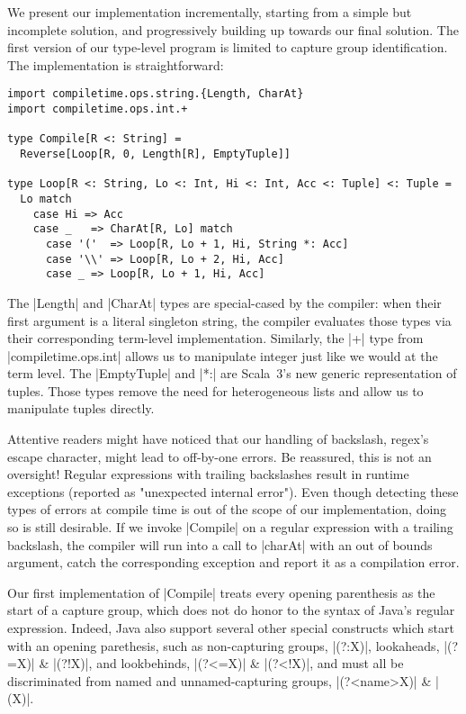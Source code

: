 We present our implementation incrementally, starting from a simple but incomplete solution, and progressively building up towards our final solution.
The first version of our type-level program is limited to capture group identification.
The implementation is straightforward:

\begin{lstlisting}
import compiletime.ops.string.{Length, CharAt}
import compiletime.ops.int.+

type Compile[R <: String] =
  Reverse[Loop[R, 0, Length[R], EmptyTuple]]

type Loop[R <: String, Lo <: Int, Hi <: Int, Acc <: Tuple] <: Tuple =
  Lo match
    case Hi => Acc
    case _   => CharAt[R, Lo] match
      case '('  => Loop[R, Lo + 1, Hi, String *: Acc]
      case '\\' => Loop[R, Lo + 2, Hi, Acc]
      case _ => Loop[R, Lo + 1, Hi, Acc]
\end{lstlisting}

\noindent
The |Length| and |CharAt| types are special-cased by the compiler: when their first argument is a literal singleton string, the compiler evaluates those types via their corresponding term-level implementation.
Similarly, the |+| type from |compiletime.ops.int| allows us to manipulate integer just like we would at the term level.
The |EmptyTuple| and |*:| are Scala~3's new generic representation of tuples.
Those types remove the need for heterogeneous lists and allow us to manipulate tuples directly.

Attentive readers might have noticed that our handling of backslash, regex's escape character, might lead to off-by-one errors.
Be reassured, this is not an oversight!
Regular expressions with trailing backslashes result in runtime exceptions (reported as "unexpected internal error").
Even though detecting these types of errors at compile time is out of the scope of our implementation, doing so is still desirable.
If we invoke |Compile| on a regular expression with a trailing backslash, the compiler will run into a call to |charAt| with an out of bounds argument, catch the corresponding exception and report it as a compilation error.

Our first implementation of |Compile| treats every opening parenthesis as the start of a capture group, which does not do honor to the syntax of Java's regular expression.
Indeed, Java also support several other special constructs which start with an opening parethesis, such as non-capturing groups, |(?:X)|, lookaheads, |(?=X)| \& |(?!X)|, and lookbehinds, |(?<=X)| \& |(?<!X)|, and must all be discriminated from named and unnamed-capturing groups, |(?<name>X)| \& |(X)|.

